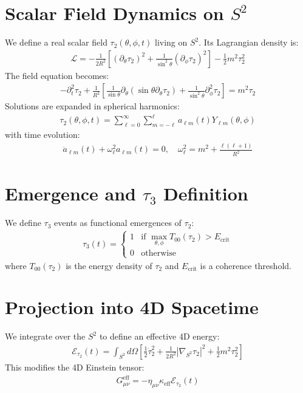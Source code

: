 \documentclass[12pt]{article}
\begin{document}
\section{Scalar Field Dynamics on $S^2$}

We define a real scalar field $\tau_2(\theta, \phi, t)$ living on $S^2$. Its Lagrangian density is:
\begin{align}
  \mathcal{L} = -\frac{1}{2R^2} \left[ (\partial_\theta \tau_2)^2 + \frac{1}{\sin^2\theta} (\partial_\phi \tau_2)^2 \right] - \frac{1}{2} m^2 \tau_2^2
\end{align}
The field equation becomes:
\begin{align}
  -\partial_t^2 \tau_2 + \frac{1}{R^2} \left[ \frac{1}{\sin\theta} \partial_\theta (\sin\theta \partial_\theta \tau_2) + \frac{1}{\sin^2\theta} \partial_\phi^2 \tau_2 \right] = m^2 \tau_2
\end{align}
Solutions are expanded in spherical harmonics:
\begin{align}
  \tau_2(\theta, \phi, t) = \sum_{\ell=0}^{\infty} \sum_{m=-\ell}^{\ell} a_{\ell m}(t) Y_{\ell m}(\theta, \phi)
\end{align}
with time evolution:
\begin{align}
  \ddot{a}_{\ell m}(t) + \omega_{\ell}^2 a_{\ell m}(t) = 0, \quad \omega_{\ell}^2 = m^2 + \frac{\ell(\ell+1)}{R^2}
\end{align}

\section{Emergence and $\tau_3$ Definition}

We define $\tau_3$ events as functional emergences of $\tau_2$:
\begin{align}
  \tau_3(t) = \begin{cases}
    1 & \text{if } \max_{\theta,\phi} T_{00}(\tau_2) > E_\text{crit} \\
    0 & \text{otherwise}
  \end{cases}
\end{align}
where $T_{00}(\tau_2)$ is the energy density of $\tau_2$ and $E_\text{crit}$ is a coherence threshold.

\section{Projection into 4D Spacetime}

We integrate over the $S^2$ to define an effective 4D energy:
\begin{align}
  \mathcal{E}_{\tau_2}(t) = \int_{S^2} d\Omega \left[ \frac{1}{2} \dot{\tau}_2^2 + \frac{1}{2R^2} |\nabla_{S^2} \tau_2|^2 + \frac{1}{2} m^2 \tau_2^2 \right]
\end{align}
This modifies the 4D Einstein tensor:
\begin{align}
  G_{\mu\nu}^{\text{eff}} = -\eta_{\mu\nu} \kappa_{\text{eff}} \mathcal{E}_{\tau_2}(t)
\end{align}
\end{document}
